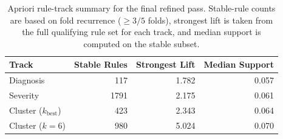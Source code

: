 \begin{table}[!htbp]
\centering
\small
\begin{tabularx}{\textwidth}{>{\raggedright\arraybackslash}Xrrr}
\toprule
Track & Stable Rules & Strongest Lift & Median Support \\
\midrule
Diagnosis & 117 & 1.782 & 0.057 \\
Severity & 1791 & 2.175 & 0.061 \\
Cluster ($k_{\mathrm{best}}$) & 423 & 2.343 & 0.064 \\
Cluster ($k=6$) & 980 & 5.024 & 0.070 \\
\bottomrule
\end{tabularx}
\caption{Apriori rule-track summary for the final refined pass. Stable-rule counts are based on fold recurrence ($\geq 3/5$ folds), strongest lift is taken from the full qualifying rule set for each track, and median support is computed on the stable subset.}
\label{tab:ch4_apriori_track_summary}
\end{table}
